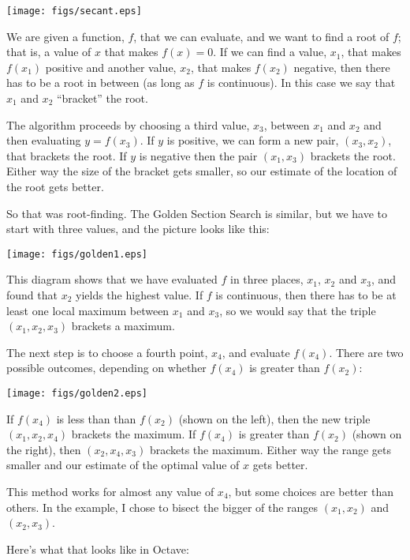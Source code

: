 \beforefig \centerline{\texttt{[image: figs/secant.eps]}}

We are given a function, $f$, that we can evaluate, and
we want to find a root of $f$; that is, a value of $x$ that makes
$f(x)=0$. If we can find a value, $x_1$, that makes $f(x_1)$ positive
and another value, $x_2$, that makes $f(x_2)$ negative, then there has
to be a root in between (as long as $f$ is continuous). In this
case we say that $x_1$ and $x_2$ ``bracket'' the root.

The algorithm proceeds by choosing a third value, $x_3$, between
$x_1$ and $x_2$ and then evaluating $y = f(x_3)$. If $y$ is
positive, we can form a new pair, $(x_3, x_2)$, that brackets the
root. If $y$ is negative then the pair $(x_1, x_3)$ brackets the root.
Either way the size of the bracket gets smaller, so our
estimate of the location of the root gets better.

So that was root-finding. The Golden Section Search is similar, but
we have to start with three values, and the picture looks like
this:

\beforefig \centerline{\texttt{[image: figs/golden1.eps]}}

This diagram shows that we have evaluated $f$ in three places,
$x_1$, $x_2$ and $x_3$, and found that $x_2$ yields the highest
value. If $f$ is continuous, then there has to be at least one
local maximum between $x_1$ and $x_3$, so we would say that the
triple $(x_1, x_2, x_3)$ brackets a maximum.

The next step is to choose a fourth point, $x_4$, and evaluate
$f(x_4)$. There are two possible outcomes, depending on whether
$f(x_4)$ is greater than $f(x_2)$:

\beforefig \centerline{\texttt{[image: figs/golden2.eps]}}

If $f(x_4)$ is less than than $f(x_2)$ (shown on the left), then the
new triple $(x_1, x_2, x_4)$ brackets the maximum. If $f(x_4)$ is
greater than $f(x_2)$ (shown on the right), then $(x_2, x_4, x_3)$
brackets the maximum. Either way the range gets smaller and our
estimate of the optimal value of $x$ gets better.

This method works for almost any value of $x_4$, but some choices
are better than others. In the example, I chose to bisect the
bigger of the ranges $(x_1, x_2)$ and $(x_2, x_3)$.

Here's what that looks like in Octave:

